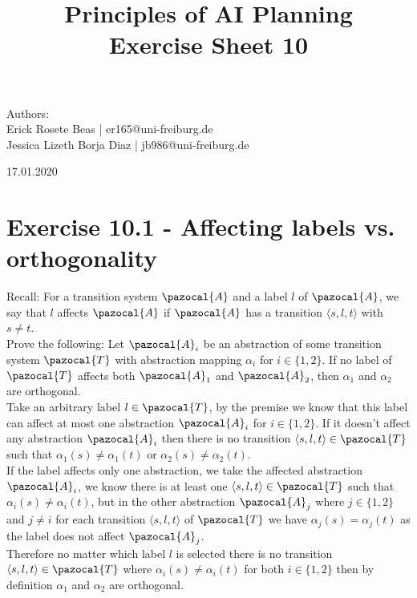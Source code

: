 \documentclass[11pt,a4paper]{article}
\title{\textbf{Principles of AI Planning
		\\{\Large Exercise Sheet 10}}}
\begin{document}
\begin{flushleft}
	Authors:\\
	Erick Rosete Beas | er165@uni-freiburg.de\\
	Jessica Lizeth Borja Diaz | jb986@uni-freiburg.de\\
\end{flushleft}
{\let\newpage\relax\maketitle}
\begin{center} 
	\large 17.01.2020
\end{center}


\section*{Exercise 10.1 - Affecting labels vs. orthogonality}
Recall: For a transition system $\pazocal{A}$ and a label $l$ of $\pazocal{A}$, we say that $l$ affects $\pazocal{A}$ if $\pazocal{A}$ has a transition $\langle s, l, t \rangle$ with $s \neq t$.\\
Prove the following: Let $\pazocal{A}_i$ be an abstraction of some transition system $\pazocal{T}$ with abstraction mapping $\alpha_i$ for $i \in \{1, 2\}$. If no label of $\pazocal{T}$ affects both $\pazocal{A}_1$ and $\pazocal{A}_2$, then $\alpha_1$ and $\alpha_2$ are orthogonal.\\

Take an arbitrary label $l \in \pazocal{T}$, by the premise we know that this label can affect at most one abstraction $\pazocal{A}_i$ for $i \in \{1, 2\}$. If it doesn't affect any abstraction $\pazocal{A}_i$ then there is no transition $\langle s, l ,t \rangle \in \pazocal{T}$ such that 
$\alpha_1(s) \neq \alpha_1(t)$ or $\alpha_2(s) \neq \alpha_2(t)$.\\
If the label affects only one abstraction, we take the affected abstraction $\pazocal{A}_i$, we know there is at least one $\langle s, l ,t \rangle \in \pazocal{T}$ such that 
$\alpha_i(s) \neq \alpha_i(t)$, but in the other abstraction $\pazocal{A}_j$ where $j \in \{1,2\}$ and $j \neq i$ for each transition $\langle s, l ,t \rangle$ of $\pazocal{T}$ we have
$\alpha_j(s) = \alpha_j(t)$ as the label does not affect $\pazocal{A}_j$.\\
Therefore no matter which label $l$ is selected there is no transition $\langle s, l, t \rangle \in \pazocal{T}$ where $\alpha_i(s) \neq \alpha_i(t)$ for both $i \in \{1, 2\}$ then by definition $\alpha_1$ and $\alpha_2$ are orthogonal.
	
\end{document}
